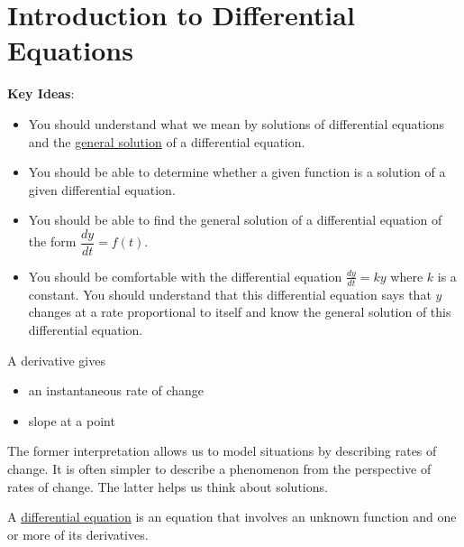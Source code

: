 \documentclass[main]{subfiles}
\begin{document}
\ifSubfilesClassLoaded{%
  \chaptermark{\chapterseven}
}{}

\section{Introduction to Differential Equations} \label{ws7-1}

\begin{problemonly}
    \begin{framed}

\textbf{Key Ideas}:

\begin{itemize}[topsep=0pt,partopsep=0pt,parsep=8pt,itemsep=0pt]

\item You should understand what we mean by solutions of differential
  equations and the \uline{general solution} of a differential equation.

\item You should be able to determine whether a given function is a
  solution of a given differential equation.

\item You should be able to find the general solution of a differential
  equation of the form $\dfrac{dy}{dt} = f(t)$.

\item You should be comfortable with the differential equation
  $\frac{dy}{dt} = ky$ where $k$ is a constant.  You should understand
  that this differential equation says that $y$ changes at a rate
  proportional to itself and know the general solution of this
  differential equation.

\end{itemize}
\end{framed}
\end{problemonly}

A derivative gives
\begin{itemize}[topsep=0pt]
    \item an instantaneous rate of change
    \item slope at a point
\end{itemize}
The former interpretation allows us to model situations by describing rates of change. It is often simpler to describe a phenomenon from the perspective of rates of change. The latter helps us think about solutions.

  \begin{framed}
    A \uline{differential equation} is an equation that involves an unknown function and one or more of its derivatives.
  \end{framed}
\end{document}
